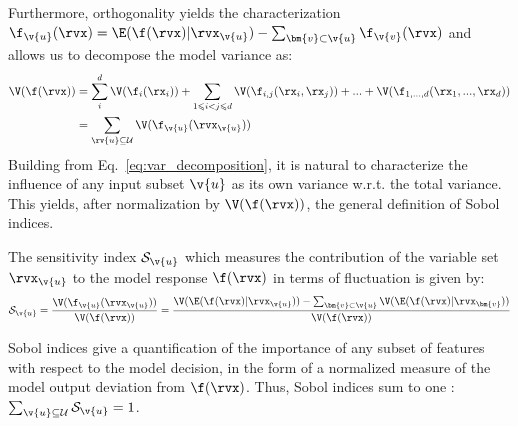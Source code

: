 Furthermore, orthogonality yields the characterization $\f_{\v{u}}(\rvx) = \E(\f(\rvx)|\rvx_{\v{u}}) - \sum_{\bm{v}\subset \v{u}}\f_{\v{v}}(\rvx)$ and allows us to decompose the model variance as:
\begin{equation}
    \label{eq:var_decomposition}
    \begin{aligned}
        \V(\f(\rvx)) &= \sum_i^d \V(\f_i(\rx_i)) +
        \sum_{1 \leqslant i < j \leqslant d} \V(\f_{i,j}(\rx_i, \rx_j)) +
        ... + \V(\f_{1,...,d}(\rx_1, ..., \rx_d)) \\
        &=\sum_{\substack{\rv{u} \subseteq \mathcal{U}}} \V(\f_{\v{u}}(\rvx_{\v{u}}))
        \end{aligned}
\end{equation}
Building from Eq.~\ref{eq:var_decomposition}, it is natural to characterize the influence of any input subset $\v{u}$ as its own variance w.r.t. the total variance. This yields, after normalization by $\V(\f(\rvx))$, the general definition of Sobol indices.
\begin{definition}
\label{def:sobol_indice}
The sensitivity index $\sob_{\v{u}}$ which measures the contribution of the variable set $\rvx_{\v{u}}$ to the model response $\f(\rvx)$ in terms of fluctuation is given by:
\begin{equation}
    \label{eq:sobol_indice}
    \sob_{\v{u}}  = \frac{ \V(\f_{\v{u}}(\rvx_{\v{u}})) }{ \V(\f(\rvx)) }
    = \frac{ \V(\E(\f(\rvx) | \rvx_{\v{u}})) - \sum_{\bm{v}\subset \v{u}}\V(\E(\f(\rvx) | \rvx_{\bm{v}} ))}{ \V(\f(\rvx)) }
\end{equation}
\end{definition}
Sobol indices give a quantification of the importance of any subset of features with respect to the model decision, in the form of a normalized measure of the model output deviation from $\f(\rvx)$. Thus, Sobol indices sum to one : $\sum_{\v{u} \subseteq \mathcal{U}} \sob_{\v{u}} = 1$.

